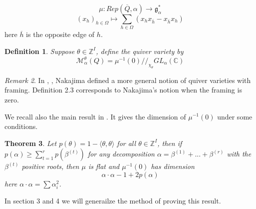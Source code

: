 \documentclass[12pt]{amsart}
\theoremstyle{plain}
\newtheorem{thm}{Theorem}[section]
\newtheorem{defn}[thm]{Definition}
\theoremstyle{definition}
\theoremstyle{remark}
\newtheorem{rem}[thm]{Remark}
\begin{document}
$$\mu:Rep(\overline{Q},\alpha)\to\mathfrak{g}_{\alpha}^*$$
$$(x_h)_{h\in\Omega}\mapsto \sum_{h\in\Omega}(x_hx_{\overline{h}}-x_{\overline{h}}x_h)$$
here $\overline{h}$ is the opposite edge of $h$.
\begin{defn}
    Suppose $\theta\in\mathbb Z^I$, define the quiver variety by
    $$\mathcal{M}^{\theta}_{\alpha}(Q)=\mu^{-1}(0)/\!\!/_{\chi_{\theta}}GL_{\alpha}(\mathbb C)$$
\end{defn}
\begin{rem} In \cite{nakajima1994instantons}, \cite{nakajima1998quiver}, Nakajima defined a more general notion of quiver varieties with framing. Definition 2.3 corresponds to Nakajima's notion when the framing is zero.
\end{rem}
\hspace{-14pt}We recall also the main result in \cite{crawley2001geometry}. It gives the dimension of $\mu^{-1}(0)$ under some conditions.
\begin{thm}
    \cite[Theorem 1.1]{crawley2001geometry} Let $p(\theta)=1-\langle\theta,\theta\rangle$ for all $\theta\in\mathbb Z^I$, then if $\displaystyle p(\alpha)\geq\sum_{t=1}^rp(\beta^{(t)})$ for any decomposition $\alpha=\beta^{(1)}+...+\beta^{(r)}$ with the $\beta^{(t)}$ positive roots, then $\mu$ is flat and $\mu^{-1}(0)$ has dimension 
    $$\alpha\cdot\alpha-1+2p(\alpha)$$
    here $\alpha\cdot\alpha=\sum\alpha_i^2$.
\end{thm}
\hspace{-13pt}In section 3 and 4 we will generailze the method of proving this result.
\end{document}
